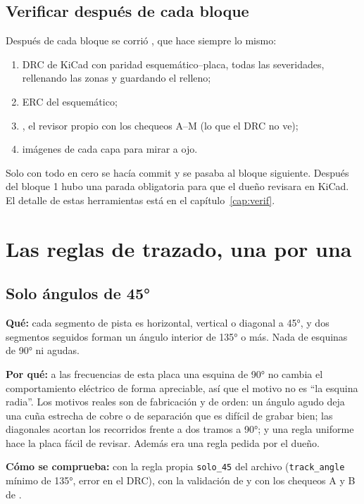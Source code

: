 \subsection{Verificar después de cada bloque}

Después de cada bloque se corrió , que hace siempre lo mismo:
\begin{enumerate}
  \item DRC de KiCad con paridad esquemático--placa, todas las severidades, rellenando las zonas y guardando el relleno;
  \item ERC del esquemático;
  \item {}, el revisor propio con los chequeos A--M (lo que el DRC no ve);
  \item imágenes de cada capa para mirar a ojo.
\end{enumerate}
Solo con todo en cero se hacía commit y se pasaba al bloque siguiente. Después del bloque 1 hubo una parada
obligatoria para que el dueño revisara en KiCad. El detalle de estas herramientas está en el capítulo~\ref{cap:verif}.

\section{Las reglas de trazado, una por una}\label{sec:c09-reglas}

\subsection{Solo ángulos de 45°}

\textbf{Qué:} cada segmento de pista es horizontal, vertical o diagonal a \ang{45}, y dos segmentos seguidos forman un
ángulo interior de \ang{135} o más. Nada de esquinas de \ang{90} ni agudas.

\textbf{Por qué:} a las frecuencias de esta placa una esquina de \ang{90} no cambia el comportamiento eléctrico de forma
apreciable, así que el motivo no es ``la esquina radia''. Los motivos reales son de fabricación y de orden: un ángulo
agudo deja una cuña estrecha de cobre o de separación que es difícil de grabar bien; las diagonales acortan los
recorridos frente a dos tramos a \ang{90}; y una regla uniforme hace la placa fácil de revisar. Además era una regla
pedida por el dueño.

\textbf{Cómo se comprueba:} con la regla propia \texttt{solo\_45} del archivo 
(\texttt{track\_angle} mínimo de \ang{135}, error en el DRC), con la validación de  y con los
chequeos A y B de .

